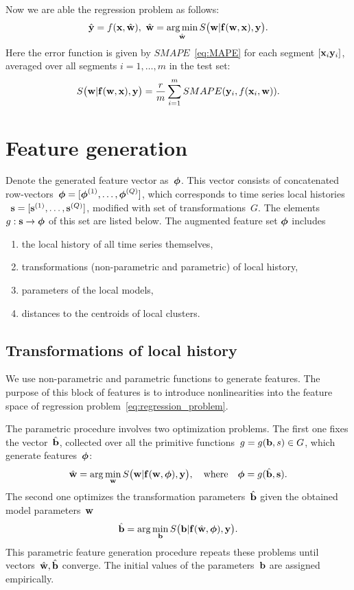 \documentclass[conference]{IEEEtran}
\begin{document}
Now we are able the regression problem as follows:
\begin{equation}\label{eq:regression_problem}
\hat{\y} = f(\x, \hat{\w}), ~\hat{\w} = \argmin_{\hat{\w}}S\bigl(\bw|\fx(\bw,\bx),\by\bigr). %
\end{equation}
Here the error function is given by $SMAPE$~\eqref{eq:MAPE} for each segment $[{\mathbf{x}}_i {\mathbf{y}}_i]$, averaged over all segments $i = 1, \dots, m$ in the test set:
\[ S\bigl(\mathbf{w}|{\mathbf{f}}(\mathbf{w},{\mathbf{x}}),{\mathbf{y}}\bigr) = \frac{r}{m}\sum_{i=1}^{m} SMAPE({\mathbf{y}}_i, f({\mathbf{x}}_i, {\mathbf{w}})).\]

\section{Feature generation}\label{sc:feature_generation}
Denote the generated feature vector as~${\boldsymbol{\phi}}$. This vector consists of concatenated row-vectors~${\boldsymbol{\phi}}=[{\boldsymbol{\phi}}^{(1)},\dots,{\boldsymbol{\phi}}^{(Q)}]$, which corresponds to time series local histories ~${\mathbf{s}}=[{\mathbf{s}}^{(1)},\dots,{\mathbf{s}}^{(Q)}]$, modified with set of transformations~$G$. The elements~$g:{\mathbf{s}}\to{\boldsymbol{\phi}}$ of this set are listed below. The augmented feature set ${\boldsymbol{\phi}}$ includes
\begin{enumerate}[1)]
\item the local history of all time series themselves,
\item transformations (non-parametric and parametric) of local history,
\item parameters of the local models,
\item distances to the centroids of local clusters.
\end{enumerate}



\subsection{Transformations of local history}
We use non-parametric and parametric functions to generate features. The purpose of this block of features is to introduce nonlinearities into the feature space of regression problem~\eqref{eq:regression_problem}.

The parametric procedure involves two optimization problems. The first one fixes the vector~$\hat{{\mathbf{b}}}$, collected over all the primitive functions~$g=g({\mathbf{b}},s) \in G$, which generate features~${\boldsymbol{\phi}}$:
\[
\hat{\mathbf{w}} = \arg\min_{\mathbf{w}} S\bigl(\mathbf{w}|{\mathbf{f}}(\mathbf{w},{\boldsymbol{\phi}}),{\mathbf{y}}\bigr),\quad
\text{where}
\quad {\boldsymbol{\phi}} = g(\hat{{\mathbf{b}}},{\mathbf{s}}).
\]
The second one optimizes the transformation parameters~$\hat{{\mathbf{b}}}$ given the obtained model parameters~$\mathbf{w}$
\[
\hat{{\mathbf{b}}} = \arg\min_{{\mathbf{b}}} S\bigl({\mathbf{b}}|{\mathbf{f}}(\hat{\mathbf{w}},{\boldsymbol{\phi}}),{\mathbf{y}}\bigr).
\]
This parametric feature generation procedure repeats these problems until vectors~$\hat{\mathbf{w}},\hat{{\mathbf{b}}}$ converge. The initial values of the parameters~${\mathbf{b}}$ are assigned empirically.
\end{document}
